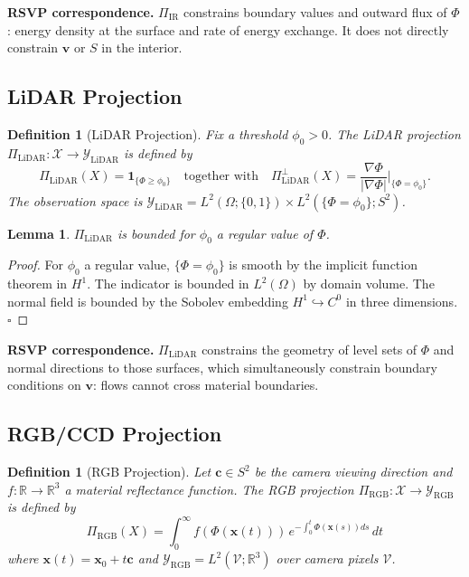 \documentclass[12pt, oneside]{article}
\newtheorem{lemma}[theorem]{Lemma}
\newtheorem{definition}[theorem]{Definition}
\begin{document}
\textbf{RSVP correspondence.} $\Pi_{\mathrm{IR}}$ constrains boundary values and outward
flux of $\Phi$: energy density at the surface and rate of energy exchange. It does not
directly constrain $\mathbf{v}$ or $S$ in the interior.

\subsection{LiDAR Projection}

\begin{definition}[LiDAR Projection]
Fix a threshold $\phi_0 > 0$. The LiDAR projection
$\Pi_{\mathrm{LiDAR}} : \mathcal{X} \to \mathcal{Y}_{\mathrm{LiDAR}}$ is defined by
\[
\Pi_{\mathrm{LiDAR}}(X) = \mathbf{1}_{\{\Phi \ge \phi_0\}}
\quad \text{together with} \quad
\Pi_{\mathrm{LiDAR}}^{\perp}(X) =
\frac{\nabla\Phi}{|\nabla\Phi|}\bigg|_{\{\Phi = \phi_0\}}.
\]
The observation space is
$\mathcal{Y}_{\mathrm{LiDAR}} = L^2(\Omega;\{0,1\}) \times L^2(\{\Phi=\phi_0\};S^2)$.
\end{definition}

\begin{lemma}
$\Pi_{\mathrm{LiDAR}}$ is bounded for $\phi_0$ a regular value of $\Phi$.
\end{lemma}
\begin{proof}
For $\phi_0$ a regular value, $\{\Phi = \phi_0\}$ is smooth by the implicit function
theorem in $H^1$. The indicator is bounded in $L^2(\Omega)$ by domain volume. The normal
field is bounded by the Sobolev embedding $H^1 \hookrightarrow C^0$ in three dimensions.
$\square$
\end{proof}

\textbf{RSVP correspondence.} $\Pi_{\mathrm{LiDAR}}$ constrains the geometry of level
sets of $\Phi$ and normal directions to those surfaces, which simultaneously constrain
boundary conditions on $\mathbf{v}$: flows cannot cross material boundaries.

\subsection{RGB/CCD Projection}

\begin{definition}[RGB Projection]
Let $\mathbf{c} \in S^2$ be the camera viewing direction and $f : \mathbb{R} \to \mathbb{R}^3$
a material reflectance function. The RGB projection
$\Pi_{\mathrm{RGB}} : \mathcal{X} \to \mathcal{Y}_{\mathrm{RGB}}$ is defined by
\[
\Pi_{\mathrm{RGB}}(X) = \int_0^\infty f(\Phi(\mathbf{x}(t)))\,
e^{-\int_0^t \Phi(\mathbf{x}(s)) ds}\, dt
\]
where $\mathbf{x}(t) = \mathbf{x}_0 + t\mathbf{c}$ and
$\mathcal{Y}_{\mathrm{RGB}} = L^2(\mathcal{V};\mathbb{R}^3)$ over camera pixels $\mathcal{V}$.
\end{definition}
\end{document}

